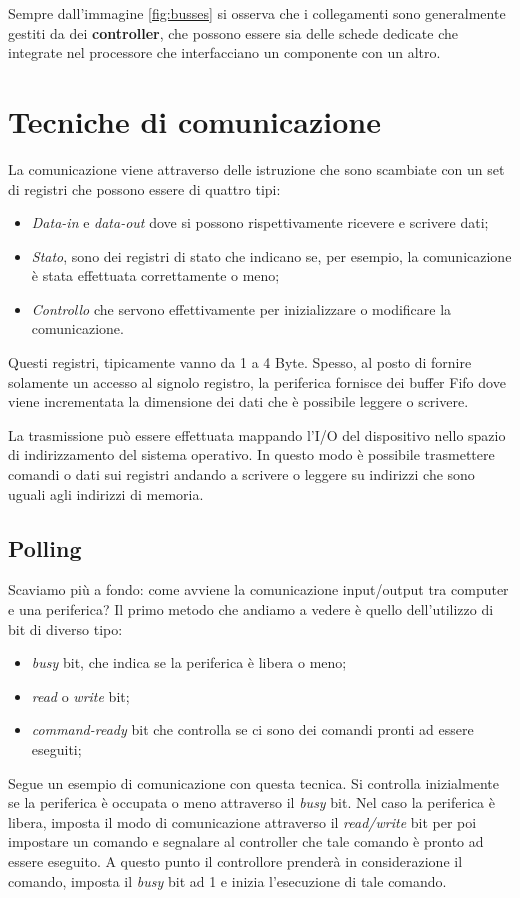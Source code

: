Sempre dall'immagine \ref{fig:busses} si osserva che i collegamenti sono generalmente gestiti da dei \textbf{controller}, che possono essere sia delle schede dedicate che integrate nel processore che interfacciano un componente con un altro.

% 
\section{Tecniche di comunicazione}
La comunicazione viene attraverso delle istruzione che sono scambiate con un set di registri che possono essere di quattro tipi:
\vspace{-5px}
\begin{itemize}
\setlength{\itemsep}{-.15 em}
    \item \textit{Data-in} e \textit{data-out} dove si possono rispettivamente ricevere e scrivere dati;
    \item \textit{Stato}, sono dei registri di stato che indicano se, per esempio, la comunicazione è stata effettuata correttamente o meno;
    \item \textit{Controllo} che servono effettivamente per inizializzare o modificare la comunicazione.
\end{itemize}
Questi registri, tipicamente vanno da 1 a 4 Byte. Spesso, al posto di fornire solamente un accesso al signolo registro, la periferica fornisce dei buffer Fifo dove viene incrementata la dimensione dei dati che è possibile leggere o scrivere. 

La trasmissione può essere effettuata mappando l'I/O del dispositivo nello spazio di indirizzamento del sistema operativo. In questo modo è possibile trasmettere comandi o dati sui registri andando a scrivere o leggere su indirizzi che sono uguali agli indirizzi di memoria. 
% 
\subsection{Polling}
Scaviamo più a fondo: come avviene la comunicazione input/output tra computer e una periferica? Il primo metodo che andiamo a vedere è quello dell'utilizzo di bit di diverso tipo:
\vspace{-5px}
\begin{itemize}
\setlength{\itemsep}{-.15 em}
    \item \textit{busy} bit, che indica se la periferica è libera o meno;
    \item \textit{read} o \textit{write} bit;
    \item \textit{command-ready} bit che controlla se ci sono dei comandi pronti ad essere eseguiti;
\end{itemize}
Segue un esempio di comunicazione con questa tecnica. Si controlla inizialmente se la periferica è occupata o meno attraverso il \textit{busy} bit. Nel caso la periferica è libera, imposta il modo di comunicazione attraverso il \textit{read/write} bit per poi impostare un comando e segnalare al controller che tale comando è pronto ad essere eseguito. A questo punto il controllore prenderà in considerazione il comando, imposta il \textit{busy} bit ad 1 e inizia l'esecuzione di tale comando.

